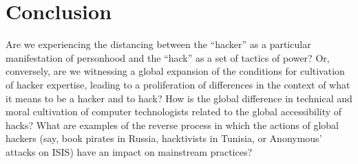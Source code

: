 \documentclass[10pt,letter,oneside]{scrartcl}
\begin{document}
%
%

\section*{Conclusion}

Are we experiencing the distancing between the ``hacker'' as a particular
manifestation of personhood and the ``hack'' as a set of tactics of power? Or,
conversely, are we witnessing a global expansion of the conditions for
cultivation of hacker expertise, leading to a proliferation of differences in
the context of what it means to be a hacker and to hack? How is the global
difference in technical and moral cultivation of computer technologists related
to the global accessibility of hacks?  What are examples of the reverse process
in which the actions of global hackers (say, book pirates in Russia, hacktivists
in Tunisia, or Anonymous' attacks on ISIS) have an impact on mainstream
practices?
\end{document}
